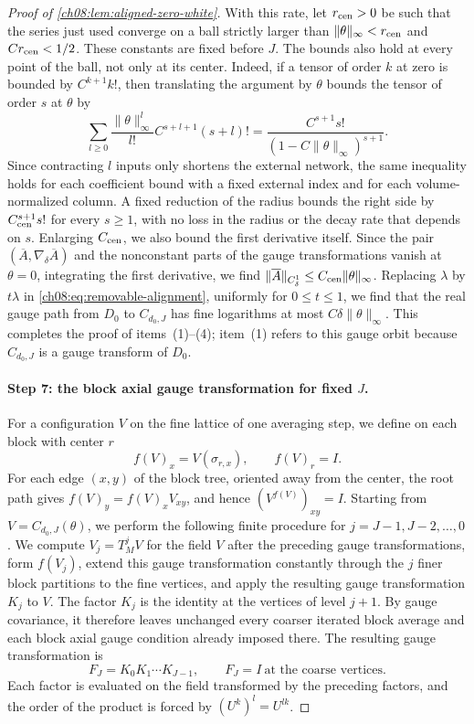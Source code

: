\begin{proof}[Proof of \cref{ch08:lem:aligned-zero-white}]
With this rate, let $r_{\rm cen}>0$ be such that the series just used converge on a ball strictly larger than $\|\theta\|_\infty<r_{\rm cen}$ and $Cr_{\rm cen}<1/2$. These constants are fixed before $J$. The bounds also hold at every point of the ball, not only at its center. Indeed, if a tensor of order $k$ at zero is bounded by $C^{k+1}k!$, then translating the argument by $\theta$ bounds the tensor of order $s$ at $\theta$ by
\[
 \sum_{l\ge0}\frac{\|\theta\|_\infty^l}{l!}
                   C^{s+l+1}(s+l)!
 =\frac{C^{s+1}s!}{(1-C\|\theta\|_\infty)^{s+1}}.
\]
Since contracting $l$ inputs only shortens the external network, the same inequality holds for each coefficient bound with a fixed external index and for each volume-normalized column. A fixed reduction of the radius bounds the right side by $C_{\rm cen}^{s+1}s!$ for every $s\ge1$, with no loss in the radius or the decay rate that depends on $s$. Enlarging $C_{\rm cen}$, we also bound the first derivative itself. Since the pair $(\overline A,\nabla_\delta\overline A)$ and the nonconstant parts of the gauge transformations vanish at $\theta=0$, integrating the first derivative, we find $\|\overline A\|_{C^1_\delta}\le C_{\rm cen}\|\theta\|_\infty$. Replacing $\lambda$ by $t\lambda$ in \eqref{ch08:eq:removable-alignment}, uniformly for $0\le t\le1$, we find that the real gauge path from $D_0$ to $C_{d_0,J}$ has fine logarithms at most $C\delta\|\theta\|_\infty$. This completes the proof of items~(1)--(4); item~(1) refers to this gauge orbit because $C_{d_0,J}$ is a gauge transform of $D_0$.

\paragraph{Step 7: the block axial gauge transformation for fixed $J$.}
For a configuration $V$ on the fine lattice of one averaging step, we define on each block with center $r$
\[
 f(V)_x=V(\sigma_{r,x}),\qquad f(V)_r=I.
\]
For each edge $(x,y)$ of the block tree, oriented away from the center, the root path gives $f(V)_y=f(V)_xV_{xy}$, and hence $(V^{f(V)})_{xy}=I$. Starting from $V=C_{d_0,J}(\theta)$, we perform the following finite procedure for $j=J-1,J-2,\dots,0$. We compute $V_j=T_M^jV$ for the field $V$ after the preceding gauge transformations, form $f(V_j)$, extend this gauge transformation constantly through the $j$ finer block partitions to the fine vertices, and apply the resulting gauge transformation $K_j$ to $V$. The factor $K_j$ is the identity at the vertices of level $j+1$. By gauge covariance, it therefore leaves unchanged every coarser iterated block average and each block axial gauge condition already imposed there. The resulting gauge transformation is
\begin{equation}\label{ch08:eq:forest-order}
 F_J=K_0K_1\cdots K_{J-1},\qquad F_J=I\ \text{at the coarse vertices}.
\end{equation}
Each factor is evaluated on the field transformed by the preceding factors, and the order of the product is forced by $(U^k)^l=U^{lk}$.


\end{proof}
